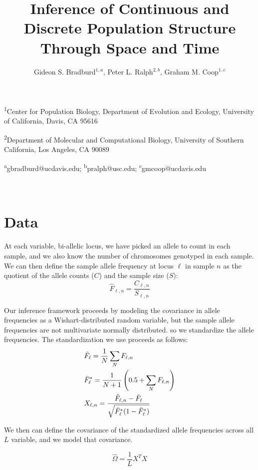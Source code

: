 \documentclass[12pt]{article}
\title{Inference of Continuous and Discrete Population Structure Through Space and Time}
\date{\vspace{-5ex}}
\author{Gideon S. Bradburd$^{1,a}$, Peter L. Ralph$^{2,b}$, Graham M. Coop$^{1,c}$}
\begin{document}
\maketitle

\textsuperscript{1}Center for Population Biology, Department of Evolution and Ecology, University of California, Davis, CA 95616

\textsuperscript{2}Department of Molecular and Computational Biology, University of Southern California, Los Angeles, CA 90089

\textsuperscript{a}gbradburd@ucdavis.edu; 
\textsuperscript{b}pralph@usc.edu;
\textsuperscript{c}gmcoop@ucdavis.edu\\\\\

\newpage

\section{Data}
At each variable, bi-allelic locus, we have picked an allele to count in each sample, and we also know the number of chromosomes genotyped in each sample.  We can then define the sample allele frequency at locus $\ell$ in sample $n$ as 
the quotient of the allele counts ($C$) and the sample size ($S$):
\begin{equation}
\hat{F}_{\ell,n} = \frac{C_{\ell,n}}{S_{\ell,n}}
\label{sample_freqs}
\end{equation}

Our inference framework proceeds by modeling the covariance in allele frequencies 
as a Wishart-distributed random variable, 
but the sample allele frequencies are not multivariate normally distributed.
so we standardize the allele frequencies.
The standardization we use proceeds as follows:
\begin{align}
&\bar{F}_{\ell} = \frac{1}{N}\sum\limits_NF_{\ell,n} \\ \notag
&\bar{F}^{*}_{\ell} = \frac{1}{N+1}\left( 0.5 + \sum\limits_N	F_{\ell,n} \right)   \\ \notag
&X_{\ell,n} = \frac{\hat{F}_{\ell,n} - \bar{F}_{\ell}}{\sqrt{\bar{F}^{*}_{\ell} (1-\bar{F}^{*}_{\ell})}}
\label{std_freqs}
\end{align}

We then can define the covariance of the standardized allele frequencies 
across all $L$ variable, and we model that covariance.

\begin{equation}
\widehat{\Omega} = \frac{1}{L} X^TX
\label{sample_std_cov}
\end{equation}
\end{document}
